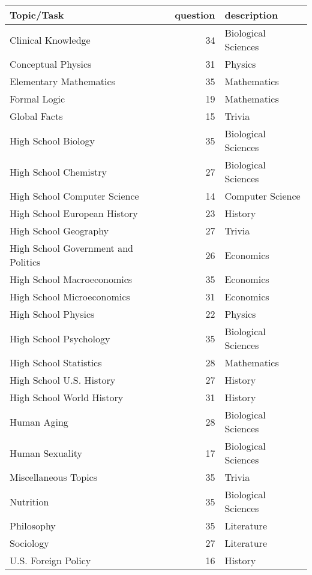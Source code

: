\begin{tabular}{lrl}
\toprule
                         Topic/Task &  question &         description \\
\midrule
                 Clinical Knowledge &        34 & Biological Sciences \\
                 Conceptual Physics &        31 &             Physics \\
             Elementary Mathematics &        35 &         Mathematics \\
                       Formal Logic &        19 &         Mathematics \\
                       Global Facts &        15 &              Trivia \\
                High School Biology &        35 & Biological Sciences \\
              High School Chemistry &        27 & Biological Sciences \\
       High School Computer Science &        14 &    Computer Science \\
       High School European History &        23 &             History \\
              High School Geography &        27 &              Trivia \\
High School Government and Politics &        26 &           Economics \\
         High School Macroeconomics &        35 &           Economics \\
         High School Microeconomics &        31 &           Economics \\
                High School Physics &        22 &             Physics \\
             High School Psychology &        35 & Biological Sciences \\
             High School Statistics &        28 &         Mathematics \\
           High School U.S. History &        27 &             History \\
          High School World History &        31 &             History \\
                        Human Aging &        28 & Biological Sciences \\
                    Human Sexuality &        17 & Biological Sciences \\
               Miscellaneous Topics &        35 &              Trivia \\
                          Nutrition &        35 & Biological Sciences \\
                         Philosophy &        35 &          Literature \\
                          Sociology &        27 &          Literature \\
                U.S. Foreign Policy &        16 &             History \\
\bottomrule
\end{tabular}
